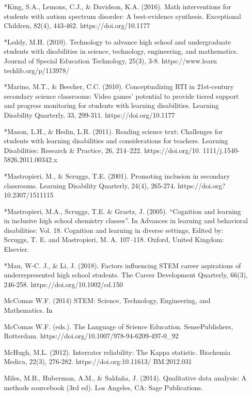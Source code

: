 \documentclass[11pt]{sig-alternate}
\begin{document}
\begin{large}
*King, S.A., Lemons, C.J., \& Davidson, K.A. (2016). Math interventions for students with autism spectrum disorder: A best-evidence synthesis. Exceptional Children, 82(4), 443-462. https://doi.org/10.1177%

*Leddy, M.H. (2010). Technology to advance high school and undergraduate students with disabilities in science, technology, engineering, and mathematics. Journal of Special Education Technology, 25(3), 3-8. https://www.learn techlib.org/p/113978/

*Marino, M.T., \& Beecher, C.C. (2010). Conceptualizing RTI in 21st-century secondary science 
classrooms: Video games’ potential to provide tiered support and progress monitoring for students with learning disabilities. Learning Disability Quarterly, 33, 299-311.
	https://doi.org/10.1177%

*Mason, L.H., \& Hedin, L.R. (2011). Reading science text: Challenges for students with learning disabilities and considerations for teachers. Learning Disabilities: Research \& Practice, 26, 214–222. https://doi.org/10. 1111/j.1540-5826.2011.00342.x

*Mastropieri, M., \& Scruggs, T.E. (2001). Promoting inclusion in secondary classrooms. Learning Disability Quarterly, 24(4), 265-274. https://doi.org?10.2307/1511115

*Mastropieri, M.A., Scruggs, T.E. \& Graetz, J. (2005). “Cognition and learning in inclusive high 
school chemistry classes”. In Advances in learning and behavioral disabilities: Vol. 18. 
Cognition and learning in diverse settings, Edited by: Scruggs, T. E. and Mastropieri, M. 
A. 107–118. Oxford, United Kingdom: Elsevier. 

*Mau, W-C. J., \& Li, J. (2018). Factors influencing STEM career aspirations of underrepresented high school students. The Career Development Quarterly, 66(3), 
246-258. https://doi.org/10.1002/cd.150

McComas W.F. (2014) STEM: Science, Technology, Engineering, and Mathematics. In 

McComas W.F. (eds.). The Language of Science Education. SensePublishers, Rotterdam.
https://doi.org/10.1007/978-94-6209-497-0_92

McHugh, M.L. (2012). Interrater reliability: The Kappa statistic. Biochemia Medica, 22(3), 276-282. https://doi.org:10.11613/ BM.2012.031 

Miles, M.B., Huberman, A.M., \& Saldaña, J. (2014). Qualitative data analysis: A methods sourcebook (3rd ed). Los Angeles, CA: Sage Publications.  


\end{large}
\end{document}
